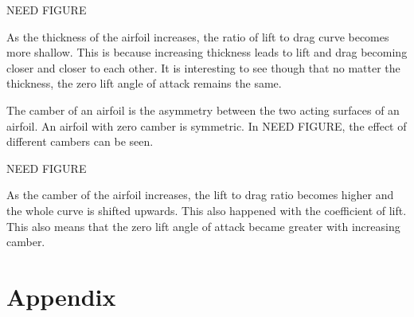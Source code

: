 \documentclass{journal}
\begin{document}
	NEED FIGURE
	
	As the thickness of the airfoil increases, the ratio of lift to drag curve becomes more shallow. This is because increasing thickness leads to lift and drag becoming closer and closer to each other. It is interesting to see though that no matter the thickness, the zero lift angle of attack remains the same.
	
	The camber of an airfoil is the asymmetry between the two acting surfaces of an airfoil. An airfoil with zero camber is symmetric. In NEED FIGURE, the effect of different cambers can be seen.
	
	NEED FIGURE
	
	As the camber of the airfoil increases, the lift to drag ratio becomes higher and the whole curve is shifted upwards. This also happened with the coefficient of lift. This also means that the zero lift angle of attack became greater with increasing camber. 
	
	
	\section*{Appendix}
	
\end{document}
